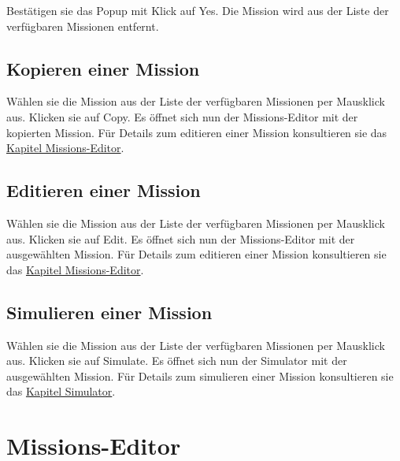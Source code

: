 Bestätigen sie das Popup mit Klick auf Yes.
Die Mission wird aus der Liste der verfügbaren Missionen entfernt.

\subsection{Kopieren einer Mission}
\unimplemented
Wählen sie die Mission aus der Liste der verfügbaren Missionen per Mausklick aus.
Klicken sie auf Copy.
Es öffnet sich nun der Missions-Editor mit der kopierten Mission.
Für Details zum editieren einer Mission konsultieren sie das \hyperlink{missioneditor}{Kapitel Missions-Editor}.

\subsection{Editieren einer Mission}
Wählen sie die Mission aus der Liste der verfügbaren Missionen per Mausklick aus.
Klicken sie auf Edit.
Es öffnet sich nun der Missions-Editor mit der ausgewählten Mission.
Für Details zum editieren einer Mission konsultieren sie das \hyperlink{missioneditor}{Kapitel Missions-Editor}.

\subsection{Simulieren einer Mission}
Wählen sie die Mission aus der Liste der verfügbaren Missionen per Mausklick aus.
Klicken sie auf Simulate.
Es öffnet sich nun der Simulator mit der ausgewählten Mission.
Für Details zum simulieren einer Mission konsultieren sie das \hyperlink{simulator}{Kapitel Simulator}.

\hypertarget{missioneditor}{\section{Missions-Editor}}

